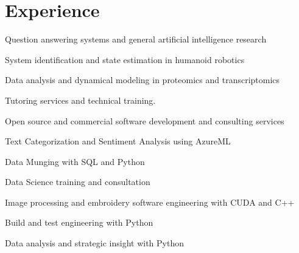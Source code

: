 \documentclass[letterpaper]{deedy-resume} %
\begin{document}
\begin{minipage}[t]{0.66\textwidth} %


\section{Experience}

\vspace{\topsep}
\begin{tightitemize}
\item Question answering systems and general artificial intelligence research
\item System identification and state estimation in humanoid robotics
\item Data analysis and dynamical modeling in proteomics and transcriptomics
\item Tutoring services and technical training.
\item Open source and commercial software development and consulting services
\end{tightitemize}

\sectionspace

\begin{tightitemize}
\item Text Categorization and Sentiment Analysis using AzureML
\item Data Munging with SQL and Python
\item Data Science training and consultation
\end{tightitemize}

\sectionspace


\begin{tightitemize}
\item Image processing and embroidery software engineering with CUDA and C++
\item Build and test engineering with Python
\item Data analysis and strategic insight with Python


\end{tightitemize}
\end{minipage}
\end{document}
